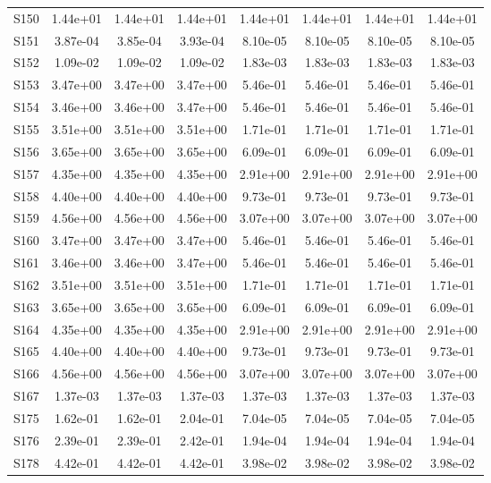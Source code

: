 {\begin{longtable}{l S[table-format=1.2e+2] S[table-format=1.2e+2] S[table-format=1.2e+2] S[table-format=1.2e+2] S[table-format=1.2e+2] S[table-format=1.2e+2] S[table-format=1.2e+2]}
S150 & 1.44e+01 & 1.44e+01 & 1.44e+01 & 1.44e+01 & 1.44e+01 & 1.44e+01 & 1.44e+01 \\
S151 & 3.87e-04 & 3.85e-04 & 3.93e-04 & 8.10e-05 & 8.10e-05 & 8.10e-05 & 8.10e-05 \\
S152 & 1.09e-02 & 1.09e-02 & 1.09e-02 & 1.83e-03 & 1.83e-03 & 1.83e-03 & 1.83e-03 \\
S153 & 3.47e+00 & 3.47e+00 & 3.47e+00 & 5.46e-01 & 5.46e-01 & 5.46e-01 & 5.46e-01 \\
S154 & 3.46e+00 & 3.46e+00 & 3.47e+00 & 5.46e-01 & 5.46e-01 & 5.46e-01 & 5.46e-01 \\
S155 & 3.51e+00 & 3.51e+00 & 3.51e+00 & 1.71e-01 & 1.71e-01 & 1.71e-01 & 1.71e-01 \\
S156 & 3.65e+00 & 3.65e+00 & 3.65e+00 & 6.09e-01 & 6.09e-01 & 6.09e-01 & 6.09e-01 \\
S157 & 4.35e+00 & 4.35e+00 & 4.35e+00 & 2.91e+00 & 2.91e+00 & 2.91e+00 & 2.91e+00 \\
S158 & 4.40e+00 & 4.40e+00 & 4.40e+00 & 9.73e-01 & 9.73e-01 & 9.73e-01 & 9.73e-01 \\
S159 & 4.56e+00 & 4.56e+00 & 4.56e+00 & 3.07e+00 & 3.07e+00 & 3.07e+00 & 3.07e+00 \\
S160 & 3.47e+00 & 3.47e+00 & 3.47e+00 & 5.46e-01 & 5.46e-01 & 5.46e-01 & 5.46e-01 \\
S161 & 3.46e+00 & 3.46e+00 & 3.47e+00 & 5.46e-01 & 5.46e-01 & 5.46e-01 & 5.46e-01 \\
S162 & 3.51e+00 & 3.51e+00 & 3.51e+00 & 1.71e-01 & 1.71e-01 & 1.71e-01 & 1.71e-01 \\
S163 & 3.65e+00 & 3.65e+00 & 3.65e+00 & 6.09e-01 & 6.09e-01 & 6.09e-01 & 6.09e-01 \\
S164 & 4.35e+00 & 4.35e+00 & 4.35e+00 & 2.91e+00 & 2.91e+00 & 2.91e+00 & 2.91e+00 \\
S165 & 4.40e+00 & 4.40e+00 & 4.40e+00 & 9.73e-01 & 9.73e-01 & 9.73e-01 & 9.73e-01 \\
S166 & 4.56e+00 & 4.56e+00 & 4.56e+00 & 3.07e+00 & 3.07e+00 & 3.07e+00 & 3.07e+00 \\
S167 & 1.37e-03 & 1.37e-03 & 1.37e-03 & 1.37e-03 & 1.37e-03 & 1.37e-03 & 1.37e-03 \\
S175 & 1.62e-01 & 1.62e-01 & 2.04e-01 & 7.04e-05 & 7.04e-05 & 7.04e-05 & 7.04e-05 \\
S176 & 2.39e-01 & 2.39e-01 & 2.42e-01 & 1.94e-04 & 1.94e-04 & 1.94e-04 & 1.94e-04 \\
S178 & 4.42e-01 & 4.42e-01 & 4.42e-01 & 3.98e-02 & 3.98e-02 & 3.98e-02 & 3.98e-02 \\

\end{longtable}}
